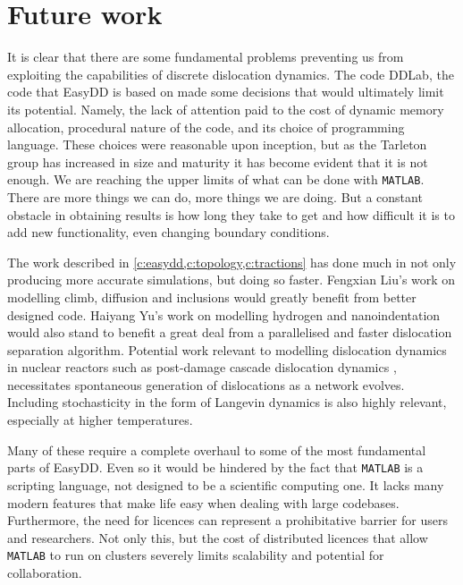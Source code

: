 \chapter{Future work}
\label{c:future}

It is clear that there are some fundamental problems preventing us from exploiting the capabilities of discrete dislocation dynamics. The code DDLab, the code that EasyDD is based on made some decisions that would ultimately limit its potential. Namely, the lack of attention paid to the cost of dynamic memory allocation, procedural nature of the code, and its choice of programming language. These choices were reasonable upon inception, but as the Tarleton group has increased in size and maturity it has become evident that it is not enough. We are reaching the upper limits of what can be done with \texttt{MATLAB}. There are more things we can do, more things we are doing. But a constant obstacle in obtaining results is how long they take to get and how difficult it is to add new functionality, even changing boundary conditions.

The work described in \cref{c:easydd,c:topology,c:tractions} has done much in not only producing more accurate simulations, but doing so faster. Fengxian Liu's work on modelling climb, diffusion and inclusions would greatly benefit from better designed code. Haiyang Yu's work on modelling hydrogen \cite{YU2018} and nanoindentation would also stand to benefit a great deal from a parallelised and faster dislocation separation algorithm. Potential work relevant to modelling dislocation dynamics in nuclear reactors such as post-damage cascade dislocation dynamics \cite{sand2014radiation}, necessitates spontaneous generation of dislocations as a network evolves. Including stochasticity in the form of Langevin dynamics \cite{li2019diffusion} is also highly relevant, especially at higher temperatures.

Many of these require a complete overhaul to some of the most fundamental parts of EasyDD. Even so it would be hindered by the fact that \texttt{MATLAB} is a scripting language, not designed to be a scientific computing one. It lacks many modern features that make life easy when dealing with large codebases. Furthermore, the need for licences can represent a prohibitative barrier for users and researchers. Not only this, but the cost of distributed licences that allow \texttt{MATLAB} to run on clusters severely limits scalability and potential for collaboration.

